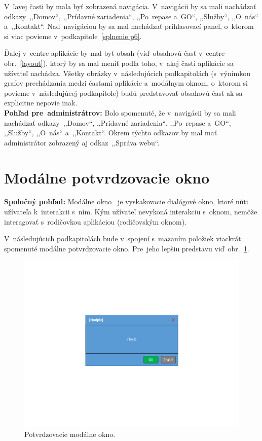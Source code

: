 V~ľavej časti by mala byť zobrazená navigácia. V~navigácii by sa mali nachádzať odkazy~,,Domov``, ,,Prídavné zariadenia``, ,,Po~repase a~GO``, ,,Služby``, ,,O~nás`` a~,,Kontakt``. Nad~navigáciou by sa mal nachádzať prihlasovací panel, o~ktorom si viac povieme v~podkapitole~\ref{splnenie p6}.

Ďalej v~centre aplikácie by mal byť obsah (viď~obsahovú časť v~centre obr.~\ref{layout}), ktorý by sa mal meniť podľa toho, v~akej časti aplikácie sa užívateľ nachádza. Všetky obrázky v~následujúcich podkapitolách (s~výnimkou grafov prechádzania medzi časťami aplikácie a~modálnym oknom, o~ktorom si povieme v~následujúcej podkapitole) budú predstavovať obsahovú časť ak sa explicitne nepovie inak.\\

\textbf{Pohľad pre~administrátrov:} Bolo spomenuté, že v~navigácii by sa mali nachádzať odkazy~,,Domov``, ,,Prídavné zariadenia``, ,,Po~repase a~GO``, ,,Služby``, ,,O~nás`` a~,,Kontakt``. Okrem týchto odkazov by mal mať administrátor zobrazený aj odkaz~,,Správa webu``.

\section{Modálne potvrdzovacie okno}
\label{modalne potvrdzovacie okno}

\textbf{Spoločný pohľad:} Modálne okno~\cite{modalne okno} je vyskakovacie dialógové okno, ktoré núti užívateľa k~interakcii s~ním. Kým užívateľ nevykoná interakciu s~oknom, nemôže interagovať s~rodičovkou aplikáciou (rodičovským oknom).

V~následujúcich podkapitolách bude v~spojení s~mazaním položiek viackrát spomenuté modálne potvrdzovacie okno. Pre~jeho lepšiu predstavu viď~obr.~\ref{confirmation modal}.

\begin{figure}[H]\centering
\includegraphics[width=140mm]{../img/UI concept/confirmation modal}
\caption{Potvrdzovacie modálne okno.}
\label{confirmation modal}
\end{figure}


